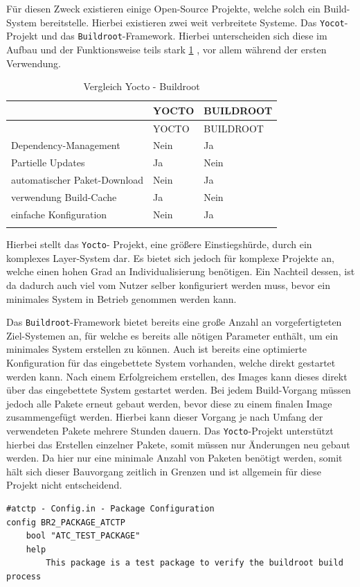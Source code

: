 Für diesen Zweck existieren einige Open-Source Projekte, welche solch
ein Build-System bereitstelle. Hierbei existieren zwei weit verbreitete
Systeme. Das
\passthrough{\lstinline!Yocot!}-Projekt\cite{yoctoproject} und das
\passthrough{\lstinline!Buildroot!}-Framework\cite{buildroot}.
Hierbei unterscheiden sich diese im Aufbau und der Funktionsweise teils
stark \ref{yoctobuildrootcomp} , vor allem während der ersten
Verwendung.

\begin{longtable}[]{@{}lll@{}}
\caption{Vergleich Yocto - Buildroot
\label{yoctobuildrootcomp}}\tabularnewline
\toprule
& YOCTO & BUILDROOT\tabularnewline
\midrule
\endfirsthead
\toprule
& YOCTO & BUILDROOT\tabularnewline
\midrule
\endhead
Dependency-Management & Nein & Ja\tabularnewline
Partielle Updates & Ja & Nein\tabularnewline
automatischer Paket-Download & Nein & Ja\tabularnewline
verwendung Build-Cache & Ja & Nein\tabularnewline
einfache Konfiguration & Nein & Ja\tabularnewline
& &\tabularnewline
\bottomrule
\end{longtable}

Hierbei stellt das \passthrough{\lstinline!Yocto!}- Projekt, eine
größere Einstiegshürde, durch ein komplexes Layer-System dar. Es bietet
sich jedoch für komplexe Projekte an, welche einen hohen Grad an
Individualisierung benötigen. Ein Nachteil dessen, ist da dadurch auch
viel vom Nutzer selber konfiguriert werden muss, bevor ein minimales
System in Betrieb genommen werden kann.

Das \passthrough{\lstinline!Buildroot!}-Framework bietet bereits eine
große Anzahl an vorgefertigteten Ziel-Systemen an, für welche es bereits
alle nötigen Parameter enthält, um ein minimales System erstellen zu
können. Auch ist bereits eine optimierte Konfiguration für das
eingebettete System vorhanden, welche direkt gestartet werden kann. Nach
einem Erfolgreichem erstellen, des Images kann dieses direkt über das
eingebettete System gestartet werden. Bei jedem Build-Vorgang müssen
jedoch alle Pakete erneut gebaut werden, bevor diese zu einem finalen
Image zusammengefügt werden. Hierbei kann dieser Vorgang je nach Umfang
der verwendeten Pakete mehrere Stunden dauern. Das
\passthrough{\lstinline!Yocto!}-Projekt unterstützt hierbei das
Erstellen einzelner Pakete, somit müssen nur Änderungen neu gebaut
werden. Da hier nur eine minimale Anzahl von Paketen benötigt werden,
somit hält sich dieser Bauvorgang zeitlich in Grenzen und ist allgemein
für diese Projekt nicht entscheidend.

\begin{lstlisting}
#atctp - Config.in - Package Configuration
config BR2_PACKAGE_ATCTP
    bool "ATC_TEST_PACKAGE"
    help
        This package is a test package to verify the buildroot build process
\end{lstlisting}

